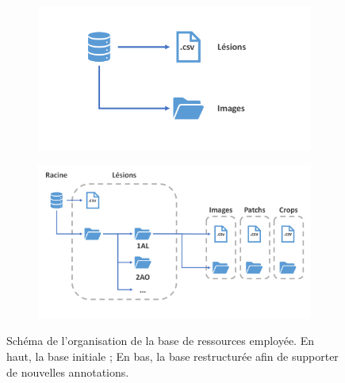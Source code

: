 \begin{figure}[H]
\centering
    \begin{subfigure}{.6\textwidth}
      \centering
      \includegraphics[width=\linewidth]{contents/chapter_3_1/resources/scheme_dbstructure_old.pdf}
    \end{subfigure}
    \begin{subfigure}{.6\textwidth}
      \centering
      \includegraphics[width=\linewidth]{contents/chapter_3_1/resources/scheme_dbstructure_new.pdf}
    \end{subfigure}
    \caption{Schéma de l'organisation de la base de ressources employée. En haut, la base initiale ; En bas, la base restructurée afin de supporter de nouvelles annotations.}
    \label{fig:db_structure}
\end{figure}\par
\clearpage

